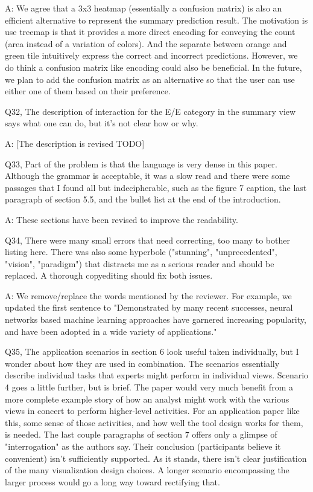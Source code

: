 A: We agree that a 3x3 heatmap (essentially a confusion matrix) is also an efficient alternative to represent the summary prediction result. The motivation is use treemap is that it provides a more direct encoding for conveying the count (area instead of a variation of colors). And the separate between orange and green tile intuitively express the correct and incorrect predictions. However, we do think a confusion matrix like encoding could also be beneficial. In the future, we plan to add the confusion matrix as an alternative so that the user can use either one of them based on their preference.


Q32, The description of interaction for the E/E category in the summary view says what one can do, but it's not clear how or why.

A: [The description is revised TODO]

Q33, Part of the problem is that the language is very dense in this paper. Although the grammar is acceptable, it was a slow read and there were some passages that I found all but indecipherable, such as the figure 7 caption, the last paragraph of section 5.5, and the bullet list at the end of the introduction.

A: These sections have been revised to improve the readability.

Q34, There were many small errors that need correcting, too many to bother listing here. There was also some hyperbole ("stunning", "unprecedented", "vision", "paradigm") that distracts me as a serious reader and should be replaced. A thorough copyediting should fix both issues.

A: We remove/replace the words mentioned by the reviewer. For example, we updated the first sentence to "Demonstrated by many recent successes, neural networks based machine learning approaches have garnered increasing popularity, and have been adopted in a wide variety of applications."


Q35, The application scenarios in section 6 look useful taken individually, but I wonder about how they are used in combination. The scenarios essentially describe individual tasks that experts might perform in individual views. Scenario 4 goes a little further, but is brief. The paper would very much benefit from a more complete example story of how an analyst might work with the various views in concert to perform higher-level activities. For an application paper like this, some sense of those activities, and how well the tool design works for them, is needed. The last couple paragraphs of section 7 offers only a glimpse of "interrogation" as the authors say.
Their conclusion (participants believe it convenient) isn't sufficiently supported. As it stands, there isn't clear justification of the many visualization design choices. A longer scenario encompassing the larger process would go a long way toward rectifying that.

